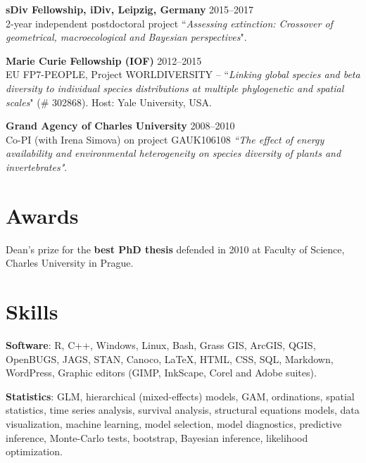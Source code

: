 \begin{innerlist}

\item[]{\bf sDiv Fellowship, iDiv, Leipzig, Germany}
\hfill {2015--2017} \\
2-year independent postdoctoral project ``\textit{Assessing extinction: Crossover of geometrical, macroecological and Bayesian perspectives}".
\\

\item[]{\bf Marie Curie Fellowship (IOF)}
\hfill {2012--2015} \\
EU FP7-PEOPLE, Project WORLDIVERSITY -- ``\textit{Linking global species and beta diversity to individual species distributions at multiple phylogenetic and spatial scales}"  (\# 302868). Host: Yale University, USA.
\\

\item[]{\bf Grand Agency of Charles University}
\hfill {2008--2010} \\
Co-PI (with Irena Simova) on project GAUK106108  \textit{``The effect of energy availability and environmental heterogeneity on species diversity of plants and invertebrates"}. 

\end{innerlist}

\HRule

\section{Awards}

Dean's prize for the \textbf{best PhD thesis} defended in 2010 at Faculty of Science, Charles University in Prague.

\HRule

\section{Skills}

{\bf Software}: R, C++, Windows, Linux, Bash, Grass GIS, ArcGIS, QGIS, OpenBUGS, JAGS, STAN, Canoco, \LaTeX, HTML, CSS, SQL, Markdown, WordPress, Graphic editors (GIMP, InkScape, Corel and Adobe suites).

\medskip

{\bf Statistics}: GLM, hierarchical (mixed-effects) models, GAM, ordinations, spatial statistics, time series analysis, survival analysis, structural equations models, data visualization, machine learning, model selection, model diagnostics, predictive inference, Monte-Carlo tests, bootstrap, Bayesian inference, likelihood optimization.

